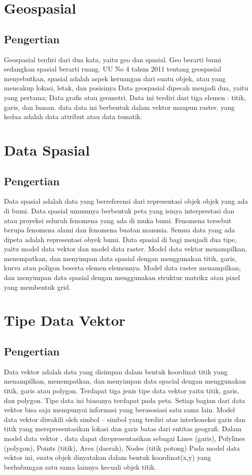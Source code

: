\section{Geospasial}
\subsection{Pengertian}
Geospasial terdiri dari dua kata, yaitu geo dan spasial. Geo berarti bumi sedangkan spasial berarti 
ruang. UU No 4 tahun 2011 tentang geospasial menyebutkan, spasial adalah aspek keruangan dari suatu objek, 
atau yang mencakup lokasi, letak, dan posisinya
Data geospasial dipecah menjadi dua, yaitu yang pertama; Data grafis atau geometri. Data ini terdiri dari
tiga elemen : titik, garis, dan luasan. data data ini berbentuk dalam vektor maupun raster. yang kedua
adalah data attribut atau data tematik.

\section{Data Spasial}
\subsection{Pengertian}
Data spasial adalah data yang berreferensi dari representasi objek objek yang ada di bumi.
Data spasial umumnya berbentuk peta yang isinya interprestasi dan atau proyeksi seluruh 
fenomena yang ada di muka bumi. Fenomena tersebut berupa fenomena alami dan fenomena 
buatan manusia. Semua data yang ada dipeta adalah representasi obyek bumi.
Data spasial di bagi menjadi dua tipe, yaitu model data vektor dan model data raster. 
Model data vektor menampilkan, menempatkan, dan menyimpan data spasial dengan menggunakan 
titik, garis, kurva atau poligon beserta elemen elemennya. Model data raster menampilkan,
dan menyimpan data spasial dengan menggunakan struktur matrikx atau pixel yang membentuk grid.

\section{Tipe Data Vektor}
\subsection{Pengertian}
Data vektor adalah data yang disimpan dalam bentuk koordinat titik yang menampilkan, 
menempatkan, dan menyimpan data spacial dengan menggunakan titik, garis atau polygon.
Terdapat tiga jenis tipe data vektor yaitu titik, garis, dan polygon. Tipe data ini 
biasanya terdapat pada peta. Setiap bagian dari data vektor bisa saja mempunyai 
informasi yang berasosiasi satu sama lain.
Model data vektor diwakili oleh simbol – simbol yang terdiri atas interkoneksi garis
dan titik yang merepresentasikan lokasi dan garis batas dari entitas geografi. Dalam
model data vektor , data dapat direpresentasikan sebagai Lines (garis), Polylines 
(polygon), Points (titik), Area (daerah), Nodes (titik potong) Pada model data vektor ini, 
suatu objek dinyatakan dalam bentuk koordinat(x,y) yang berhubungan satu sama lainnya kecuali objek titik.

